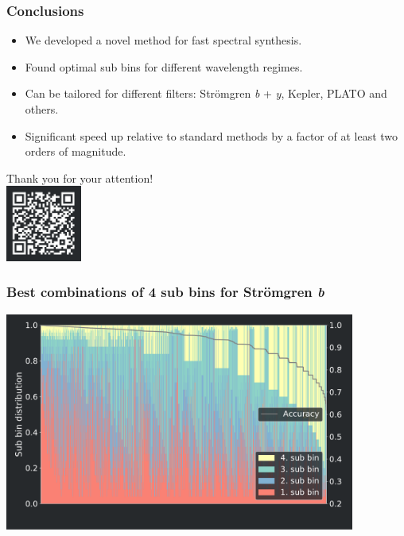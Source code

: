 \frame
{
	\frametitle{Conclusions}
	\large{
	\begin{itemize}
	\item We developed a novel method for fast spectral synthesis. \\[15pt]
	\item Found optimal sub bins for different wavelength regimes.\\[15pt]
    \item Can be tailored for different filters: Strömgren \textit{b} + \textit{y}, Kepler, PLATO  and others.\\[15pt]
    \item Significant speed up relative to standard  methods by a factor of at least two orders of magnitude.\\[10pt]
	\end{itemize}
	
	}
	\pause
		\centering \alert{\Large{Thank you for your attention!}} \\
		\includegraphics[width=25mm]{images/qr}
}


\frame
{
	\frametitle{Best combinations of 4 sub bins for Str\"omgren \textit{b}}
	\centering
	\includegraphics[width=115mm]{images/optimal_stroemgren_0_c_b}
}

